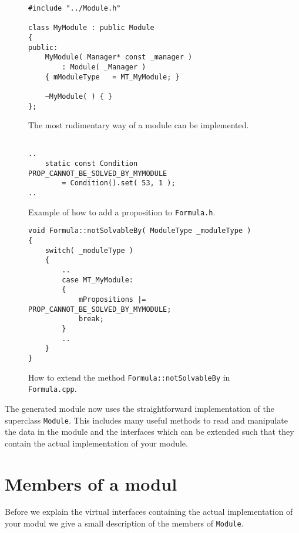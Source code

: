 \begin{figure}[htb]
\caption{The most rudimentary way of a module can be implemented.}
\label{fig:rudiimplementation}
\begin{verbatim}
#include "../Module.h"

class MyModule : public Module
{
public:
    MyModule( Manager* const _manager )
        : Module( _Manager )
    { mModuleType	= MT_MyModule; }

    ~MyModule( ) { }
};
\end{verbatim}
\end{figure}

\begin{figure}[htb]
\caption{Example of how to add a proposition to \texttt{Formula.h}.}
\label{fig:proposition}
\begin{verbatim}

..
    static const Condition PROP_CANNOT_BE_SOLVED_BY_MYMODULE
        = Condition().set( 53, 1 );
..
\end{verbatim}
\end{figure}

\begin{figure}[htb]
\caption{How to extend the method \texttt{Formula::notSolvableBy} in \texttt{Formula.cpp}.}
\label{fig:notSolvableBy}
\begin{verbatim}
void Formula::notSolvableBy( ModuleType _moduleType )
{
    switch( _moduleType )
    {
	    ..
	    case MT_MyModule:
	    {
	        mPropositions |= PROP_CANNOT_BE_SOLVED_BY_MYMODULE;
	        break;
	    }
	    ..
    }
}
\end{verbatim}
\end{figure}

The generated module now uses the straightforward implementation of the superclass
\texttt{Module}. This includes many useful methods to read and
manipulate the data in the module and the interfaces which can be extended
such that they contain the actual implementation of your module.

\section{Members of a modul}
Before we explain the virtual interfaces containing the actual
implementation of your modul we give a small description of the members
of \texttt{Module}.

